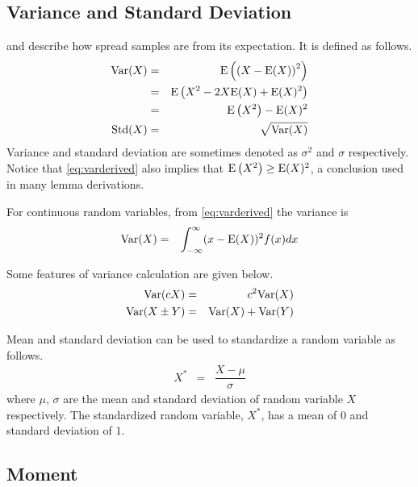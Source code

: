 \subsection{Variance and Standard Deviation}

 and  describe how spread samples are from its expectation. It is defined as follows.
\begin{eqnarray}
	\textup{Var}(X) &=& \textup{E}\left(\left(X-\textup{E}(X)\right)^2\right) \label{eq:vardef} \\
	&=& \textup{E}\left(X^2-2X\textup{E}(X)+\textup{E}(X)^2\right) \nonumber \\
	&=& \textup{E}\left(X^2\right)-\textup{E}(X)^2 \label{eq:varderived} \\
	\textup{Std}(X) &=& \sqrt{\textup{Var}(X)} \nonumber
\end{eqnarray}
Variance and standard deviation are sometimes denoted as $\sigma^2$ and $\sigma$ respectively. Notice that \eqref{eq:varderived} also implies that $\textup{E}\left(X^2\right) \geq \textup{E}(X)^2$, a conclusion used in many lemma derivations.

For continuous random variables, from \eqref{eq:varderived} the variance is
\begin{eqnarray}
	\textup{Var}(X) &=& \int_{-\infty}^{\infty} (x-\textup{E}(X))^2f(x)dx \nonumber \\
\end{eqnarray}

Some features of variance calculation are given below.
\begin{eqnarray}
	\textup{Var}(cX) &=& c^2\textup{Var}(X) \nonumber \\
	\textup{Var}(X\pm Y) &=& \textup{Var}(X) + \textup{Var}(Y) \nonumber
\end{eqnarray}

Mean and standard deviation can be used to standardize a random variable as follows.
\begin{eqnarray}
	X^* &=& \dfrac{X-\mu}{\sigma} \nonumber
\end{eqnarray}
where $\mu$, $\sigma$ are the mean and standard deviation of random variable $X$ respectively. The standardized random variable, $X^*$, has a mean of $0$ and standard deviation of $1$.

\subsection{Moment} \label{sec:moments}

